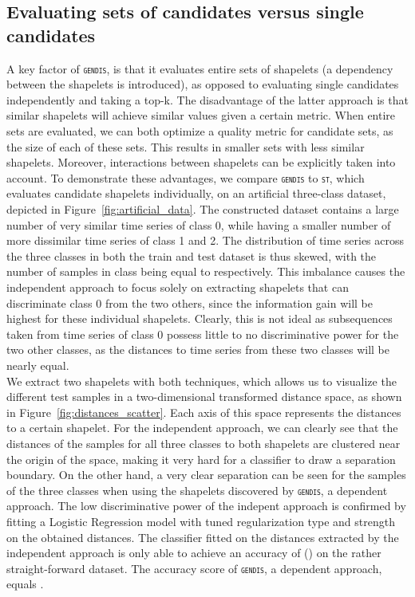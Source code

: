 \documentclass[runningheads]{llncs}
\begin{document}
\subsection{Evaluating sets of candidates versus single candidates} \label{subsec:sets}

A key factor of \textsc{\texttt{gendis}}, is that it evaluates entire sets of shapelets (a dependency between the shapelets is introduced), as opposed to evaluating single candidates independently and taking a top-k. The disadvantage of the latter approach is that similar shapelets will achieve similar values given a certain metric. When entire sets are evaluated, we can both optimize a quality metric for candidate sets, as the size of each of these sets. This results in smaller sets with less similar shapelets. Moreover, interactions between shapelets can be explicitly taken into account. To demonstrate these advantages, we compare \textsc{\texttt{gendis}} to \textsc{\texttt{st}}, which evaluates candidate shapelets individually, on an artificial three-class dataset, depicted in Figure~\ref{fig:artificial_data}. The constructed dataset contains a large number of very similar time series of class 0, while having a smaller number of more dissimilar time series of class 1 and 2. The distribution of time series across the three classes in both the train and test dataset is thus skewed, with the number of samples in class  being equal to  respectively. This imbalance causes the independent approach to focus solely on extracting shapelets that can discriminate class 0 from the two others, since the information gain will be highest for these individual shapelets. Clearly, this is not ideal as subsequences taken from time series of class 0 possess little to no discriminative power for the two other classes, as the distances to time series from these two classes will be nearly equal. \\

We extract two shapelets with both techniques, which allows us to visualize the different test samples in a two-dimensional transformed distance space, as shown in Figure~\ref{fig:distances_scatter}. Each axis of this space represents the distances to a certain shapelet. For the independent approach, we can clearly see that the distances of the samples for all three classes to both shapelets are clustered near the origin of the space, making it very hard for a classifier to draw a separation boundary. On the other hand, a very clear separation can be seen for the samples of the three classes when using the shapelets discovered by \textsc{\texttt{gendis}}, a dependent approach. The low discriminative power of the indepent approach is confirmed by fitting a Logistic Regression model with tuned regularization type and strength on the obtained distances. The classifier fitted on the distances extracted by the independent approach is only able to achieve an accuracy of  () on the rather straight-forward dataset. The accuracy score of \textsc{\texttt{gendis}}, a dependent approach, equals .
\end{document}
